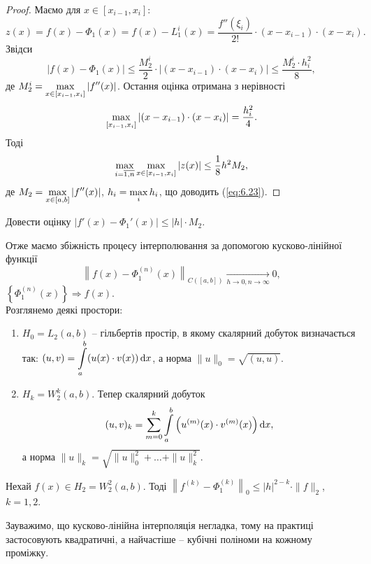 \begin{proof}
    Маємо для $x \in [x_{i-1}, x_i]$:
    \[ z(x) = f(x) - \Phi_1(x) = f(x) - L_1^i(x) = \dfrac{f''(\xi_i)}{2!} \cdot(x-x_{i-1})\cdot(x-x_i). \]
    Звідси 
    \begin{equation}
        \label{eq:6.24}
        |f(x) - \Phi_1(x)| \le \dfrac{M_2^i}{2} \cdot |(x-x_{i-1}) \cdot (x - x_i)| \le \dfrac{M_2^i \cdot h_i^2}{8},
    \end{equation}
    де $M_2^i = \displaystyle\max\limits_{x\in[x_{i-1},x_i]} |f''(x)|$. Остання оцінка отримана з нерівності
    \[ \displaystyle\max\limits_{[x_{i-1},x_i]} |(x-x_{i-1}) \cdot (x - x_i)| = \dfrac{h_i^2}{4}. \]
    Тоді
    \begin{equation}
        \label{eq:6.25}
        \displaystyle\max\limits_{i=\overline{1,n}} \displaystyle\max\limits_{x\in[x_{i-1},x_i]} |z(x)| \le \dfrac18 h^2 M_2,
    \end{equation}
    де $M_2 = \displaystyle\max\limits_{x\in[a,b]} |f''(x)|$, $h_i = \displaystyle\max\limits_i h_i$, що доводить (\ref{eq:6.23}).
\end{proof}
\begin{problem}
    Довести оцінку $|f'(x) - \Phi_1'(x)| \le |h|\cdot M_2$.
\end{problem}
Отже маємо збіжність процесу інтерполювання за допомогою кусково-лінійної функції \[\left\|f(x)-\Phi_1^{(n)}(x)\right\|_{C([a,b])}\xrightarrow[h\to 0, n \to \infty]{}0,\] $\left\{\Phi_1^{(n)}(x)\right\} \Rightarrow f(x)$. \\

Розглянемо деякі простори:
\begin{enumerate}
    \item $H_0 = L_2(a,b)$ -- гільбертів простір, в якому скалярний добуток визначається так: $(u,v)=\displaystyle\int\limits_a^b (u(x) \cdot v(x)) \mathop{}\!\mathrm{d} x$, а норма $\|u\|_0 = \sqrt{(u,u)}$.
    \item $H_k = W_2^k(a,b)$. Тепер скалярний добуток \[(u,v)_k = \displaystyle\sum\limits_{m=0}^k \displaystyle\int\limits_a^b \left(u^{(m)}(x) \cdot v^{(m)}(x)\right) \mathop{}\!\mathrm{d} x,\] а норма $\|u\|_k = \sqrt{\|u\|_0^2 + \ldots + \|u\|_k^2}$.
\end{enumerate}
\begin{theorem}
    Нехай $f(x) \in H_2 = W_2^2(a,b)$. Тоді $\left\|f^{(k)}-\Phi_1^{(k)}\right\|_0 \le |h|^{2-k}\cdot \|f\|_2$, $k=1,2$. 
\end{theorem}
Зауважимо, що кусково-лінійна інтерполяція негладка, тому на практиці застосовують квадратичні, а найчастіше -- кубічні поліноми на кожному проміжку.
